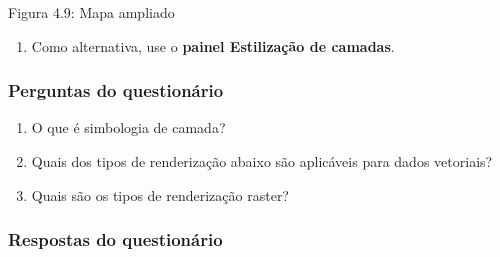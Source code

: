 \documentclass[
]{book}
\providecommand{\tightlist}{%
  \setlength{\itemsep}{0pt}\setlength{\parskip}{0pt}}
\begin{document}
Figura 4.9: Mapa ampliado

\begin{enumerate}
\def\labelenumi{\arabic{enumi}.}
\setcounter{enumi}{5}
\tightlist
\item
  Como alternativa, use o \textbf{painel Estilização de camadas}.
\end{enumerate}

\hypertarget{perguntas-do-questionuxe1rio-9}{%
\subsubsection{\texorpdfstring{\textbf{Perguntas do questionário}}{Perguntas do questionário}}\label{perguntas-do-questionuxe1rio-9}}

\begin{enumerate}
\def\labelenumi{\arabic{enumi}.}
\tightlist
\item
  O que é simbologia de camada?
\item
  Quais dos tipos de renderização abaixo são aplicáveis para dados vetoriais?
\item
  Quais são os tipos de renderização raster?
\end{enumerate}

\hypertarget{respostas-do-questionuxe1rio}{%
\subsubsection{\texorpdfstring{\textbf{Respostas do questionário}}{Respostas do questionário}}\label{respostas-do-questionuxe1rio}}
\end{document}
